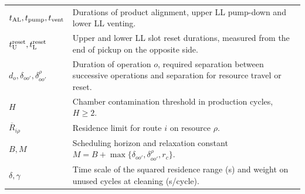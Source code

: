 \documentclass[preprint,12pt,nonatbib]{elsarticle}
\begin{document}
\begin{table}[!htbp]
\begin{tabular}{@{}C{0.20\textwidth}C{\textwidth-8pt\relax}@{}}
$t_{\rm AL},t_{\rm pump},t_{\rm vent}$ & Durations of product alignment, upper LL pump-down and lower LL venting.\\
$t_{\rm U}^{\rm reset},t_{\rm L}^{\rm reset}$ & Upper and lower LL slot reset durations, measured from the end of pickup on the opposite side.\\
$d_o,\delta_{oo'},\delta^\rho_{oo'}$ & Duration of operation $o$, required separation between successive operations and separation for resource travel or reset.\\
$H$ & Chamber contamination threshold in production cycles, $H\ge2$.\\
$\overline R_{i\rho}$ & Residence limit for route $i$ on resource $\rho$.\\
$B,M$ & Scheduling horizon and relaxation constant $M=B+\max\{\delta_{oo'},\delta^\rho_{oo'},r_c\}$.\\
$\delta,\gamma$ & Time scale of the squared residence range (s) and weight on unused cycles at cleaning (s/cycle).\\
\bottomrule
\end{tabular}
\end{table}
\end{document}
